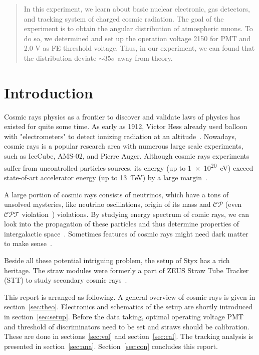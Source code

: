 \begin{abstract}
	In this experiment, we learn about basic nuclear electronic, gas detectors, and tracking system of charged cosmic radiation. The goal of the experiment is to obtain the angular distribution of atmospheric muons. To do so, we determined and set up the operation voltage \num{2150} for PMT and \num{2.0} V as FE threshold voltage. Thus, in our experiment, we can found that the distribution deviate $\sim 35\sigma$ away from theory.
\end{abstract}

\section{Introduction}
Cosmic rays physics as a frontier to discover and validate laws of physics has existed for quite some time. As early as 1912, Victor Hess already used balloon with "electrometers" to detect ionizing radiation at an altitude~\cite{wiki:cosmic}. Nowadays, cosmic rays is a popular research area with numerous large scale experiments, such as IceCube, AMS-02, and Pierre Auger. Although cosmic rays experiments suffer from uncontrolled particles sources, its energy (up to \SI{1e20}{\eV}) exceed state-of-art accelerator energy (up to \SI{13}{\tera\eV}) by a large margin~\cite{Gaisser}. 

A large portion of cosmic rays consists of neutrinos, which have a tons of unsolved mysteries, like neutrino oscillations, origin of its mass and $\mathcal{CP}$ (even $\mathcal{CPT}$ violation~\cite{Barenboim_2017}) violations. By studying energy spectrum of comic rays, we can look into the propagation of these particles and thus determine properties of intergalactic space~\cite{Gaisser}. Sometimes features of cosmic rays might need dark matter to make sense~\cite{grupen}\cite{Gomez_Coral_2020}.

Beside all these potential intriguing problem, the setup of Styx has a rich heritage. The straw modules were formerly a part of ZEUS Straw Tube Tracker (STT) to study secondary cosmic rays~\cite{Styx}.

This report is arranged as following. A general overview of cosmic rays is given in section~\ref{sec:theo}. Electronics and schematics of the setup are shortly introduced in section~\ref{sec:setup}. Before the data taking, optimal operating voltage PMT and threshold of discriminators need to be set and straws should be calibration. These are done in sections~\ref{sec:vol} and section~\ref{sec:cal}. The tracking analysis is presented in section~\ref{sec:ana}. Section~\ref{sec:con} concludes this report.

